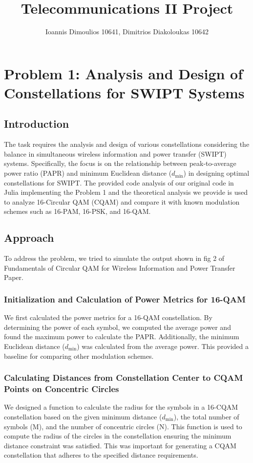 \documentclass[11pt,a4paper,oneside]{article}
\title{Telecommunications II Project}
\author{Ioannis Dimoulios 10641, Dimitrios Diakoloukas 10642}
\date{}
\begin{document}
\maketitle

\section{Problem 1: Analysis and Design of Constellations for SWIPT Systems}

\subsection{Introduction}
The task requires the analysis and design of various constellations considering the
balance in simultaneous wireless information and power transfer (SWIPT) systems.
Specifically, the focus is on the relationship between peak-to-average power ratio (PAPR)
and minimum Euclidean distance ($d_{\text{min}}$) in designing optimal constellations for SWIPT.
The provided code analysis of our original code in Julia implementing the Problem 1 and the theoretical
analysis we provide is used to analyze 16-Circular QAM (CQAM) and compare it with known modulation schemes such as 16-PAM, 16-PSK, and 16-QAM.

\subsection{Approach}
To address the problem, we tried to simulate the output shown in fig 2 of Fundamentals
of Circular QAM for Wireless Information and Power Transfer Paper.

\subsubsection{Initialization and Calculation of Power Metrics for 16-QAM}
We first calculated the power metrics for a 16-QAM constellation.
By determining the power of each symbol, we computed the average power and found the maximum power to calculate the PAPR. Additionally, the minimum Euclidean distance ($d_{\text{min}}$)
was calculated from the average power. This provided a baseline for comparing other modulation schemes.

\subsubsection{Calculating Distances from Constellation Center to CQAM Points on Concentric Circles}
We designed a function to calculate the radius for the symbols
in a 16-CQAM constellation based on the given minimum distance ($d_{\text{min}}$), the total number of symbols (M),
and the number of concentric circles (N). This function is used to compute the radius of the circles in the constellation ensuring the minimum distance constraint was satisfied.
This was important for generating a CQAM constellation that adheres to the specified distance requirements.
\end{document}
